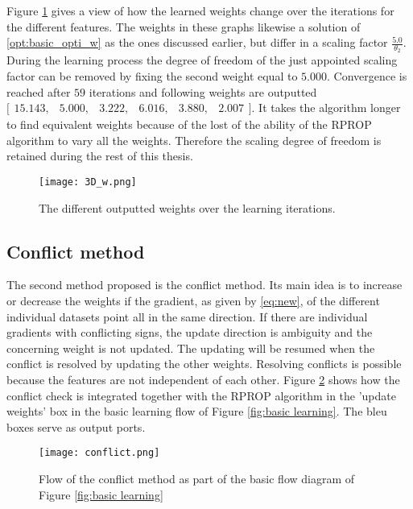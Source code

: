 Figure \ref{fig:3D_w} gives a view of how the learned weights change over the iterations for the different features. The weights in these graphs likewise a solution of \ref{opt:basic_opti_w} as the ones discussed earlier, but differ in a scaling factor $\frac{5.0}{\theta_2}$. During the learning process the degree of freedom of the just appointed scaling factor can be removed by fixing the second weight equal to $5.000$. Convergence is reached after $59$ iterations and following weights are outputted $\bigl[ \begin{smallmatrix} 15.143,&5.000,&3.222,&6.016,&3.880,&2.007\end{smallmatrix}\bigr]$. It takes the algorithm longer to find equivalent weights because of the lost of the ability of the RPROP algorithm to vary all the weights. Therefore the scaling degree of freedom is retained during the rest of this thesis. \\

 
\begin{figure}[h!]
	\centering
	\texttt{[image: 3D\_w.png]}
	\caption{The different outputted weights over the learning iterations.}
	\label{fig:3D_w}
\end{figure}

\subsection{Conflict method}
 The second method proposed is the conflict method. Its main idea is to increase or decrease the weights if the gradient, as given by \ref{eq:new}, of the different individual datasets point all in the same direction. If there are individual gradients with conflicting signs, the update direction is ambiguity and the concerning weight is not updated. The updating will be resumed when the conflict is resolved by updating the other weights. Resolving conflicts is possible because the features are not independent of each other. Figure \ref{fig:conflict} shows how the conflict check is integrated together with the RPROP algorithm in the 'update weights' box in the basic learning flow of Figure \ref{fig:basic learning}. The bleu boxes serve as output ports.\\
 
  \begin{figure}[h!]
 	\centering
 	\texttt{[image: conflict.png]}
 	\caption{Flow of the conflict method as part of the basic flow diagram of Figure \ref{fig:basic learning}}
 	\label{fig:conflict}
 \end{figure}

